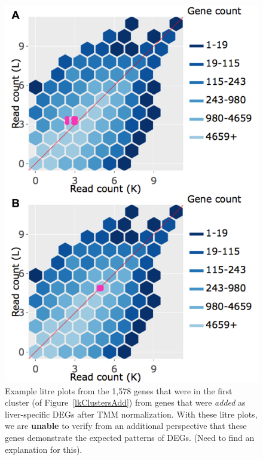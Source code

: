 \documentclass{article}
\begin{document}
\null
\begin{figure}[t!]
\centerline{\includegraphics[width=0.7\columnwidth]{../MakeFigures/Dashboards/litreClusterAdd/litreClusterAdd.jpg}}
\caption{Example litre plots from the 1,578 genes that were in the first cluster (of Figure~\ref{lkClustersAdd}) from genes that were \textit{added} as liver-specific DEGs after TMM normalization. With these litre plots, we are \textbf{unable} to verify from an additional perspective that these genes demonstrate the expected patterns of DEGs. (Need to find an explanation for this).
\label{litreClusterAdd}}
\end{figure}
\end{document}
